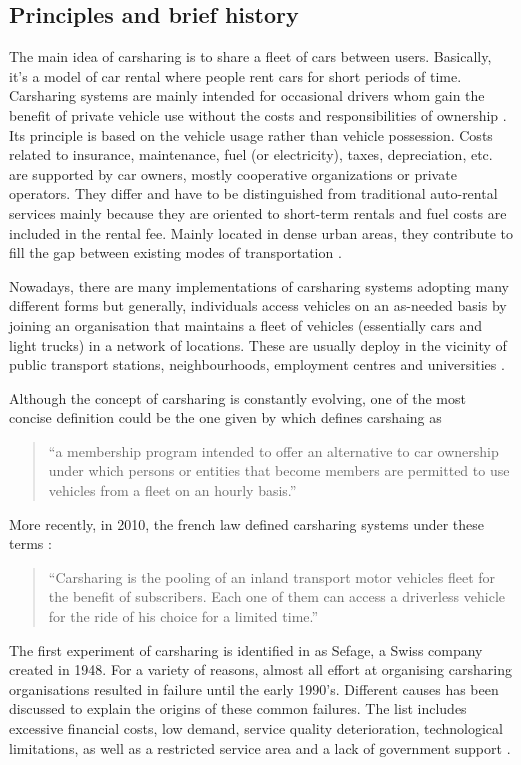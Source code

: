 \begin{bibunit}[ieeetr]
\subsection{Principles and brief history}
The main idea of carsharing is to share a fleet of cars between users.
Basically, it's a model of car rental where people rent cars for short periods of time.
Carsharing systems are mainly intended for occasional drivers whom gain the benefit of private vehicle use without the costs and responsibilities of ownership \cite{shaheen_carsharing_1998}.
Its principle is based on the vehicle usage rather than vehicle possession.
Costs related to insurance, maintenance, fuel (or electricity), taxes, depreciation, etc. are supported by car owners, \ie mostly cooperative organizations or private operators.
They differ and have to be distinguished from traditional auto-rental services mainly because they are oriented to short-term rentals and fuel costs are included in the rental fee.
Mainly located in dense urban areas, they contribute to fill the gap between existing modes of transportation \cite{louvet_enquete_2013}.

\medskip
Nowadays, there are many implementations of carsharing systems adopting many different forms but generally, individuals access vehicles on an as-needed basis by joining an organisation that maintains a fleet of vehicles (essentially cars and light trucks) in a network of locations.
These are usually deploy in the vicinity of public transport stations, neighbourhoods, employment centres and universities \cite{shaheen_carsharing_1998}.

\bigskip
Although the concept of carsharing is constantly evolving, one of the most concise definition could be the one given by \cite{millard_ball_car_sharing_2005} which defines carshaing as
\begin{quote}
``a membership program intended to offer an alternative to car ownership under which persons or entities that become members are permitted to use vehicles from a fleet on an hourly basis.''
\end{quote}
More recently, in 2010, the french law defined carsharing systems under these terms :
\begin{quote}
``Carsharing is the pooling of an inland transport motor vehicles fleet for the benefit of subscribers. Each one of them can access a driverless vehicle for the ride of his choice for a limited time.'' \cite{cs_loi_2010}
\end{quote}

\bigskip
The first experiment of carsharing is identified in \cite{shaheen_short_1999} as Sefage, a Swiss company created in 1948.
For a variety of reasons, almost all effort at organising carsharing organisations resulted in failure until the early 1990's.
Different causes has been discussed to explain the origins of these common failures.
The list includes excessive financial costs, low demand, service quality deterioration, technological limitations, as well as a restricted service area and a lack of government support \cite{harms_emergence_1998, cousins_theory_2000}.


\end{bibunit}
